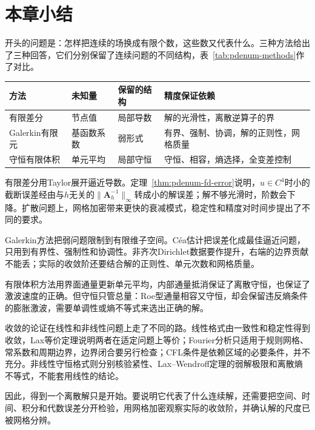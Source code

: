 \section{本章小结}
\label{sec:pdenum-summary}

开头的问题是：怎样把连续的场换成有限个数，这些数又代表什么。三种方法给出了三种回答，它们分别保留了连续问题的不同结构，表~\ref{tab:pdenum-methods}作了对比。

\begin{BookInlineTable}
 \centering
 \caption{三种离散方法的对比。}
 \label{tab:pdenum-methods}
 \begin{tabular}{p{16mm}p{20mm}p{20mm}p{38mm}}
  \toprule
  方法 & 未知量 & 保留的结构 & 精度保证依赖\\
  \midrule
  有限差分 & 节点值 & 局部导数 & 解的光滑性，离散逆算子的界\\
  Galerkin有限元 & 基函数系数 & 弱形式 & 有界、强制、协调，解的正则性，网格质量\\
  守恒有限体积 & 单元平均 & 局部守恒 & 守恒、相容，熵选择，全变差控制\\
  \bottomrule
 \end{tabular}
\end{BookInlineTable}

有限差分用Taylor展开逼近导数。定理~\ref{thm:pdenum-fd-error}说明，$u\in C^4$时小的截断误差经由与$h$无关的$\lVert\bm{A}_h^{-1}\rVert_\infty$转成小的解误差；解不够光滑时，阶数会下降。扩散问题上，网格加密带来更快的衰减模式，稳定性和精度对时间步提出了不同的要求。

Galerkin方法把弱问题限制到有限维子空间。Céa估计把误差化成最佳逼近问题，只用到有界性、强制性和协调性。非齐次Dirichlet数据要作提升，右端的边界贡献不能丢；实际的收敛阶还要结合解的正则性、单元次数和网格质量。

有限体积方法用界面通量更新单元平均，内部通量抵消保证了离散守恒，也保证了激波速度的正确。但守恒只管总量：Roe型通量相容又守恒，却会保留违反熵条件的膨胀激波，需要单调性或熵不等式来选出正确的解。

收敛的论证在线性和非线性问题上走了不同的路。线性格式由一致性和稳定性得到收敛，Lax等价定理说明两者在适定问题上等价；Fourier分析只适用于规则网格、常系数和周期边界，边界闭合要另行检查；CFL条件是依赖区域的必要条件，并不充分。非线性守恒格式则分别核验紧性、Lax--Wendroff定理的弱解极限和离散熵不等式，不能套用线性的结论。

因此，得到一个离散解只是开始。要说明它代表了什么连续解，还需要把空间、时间、积分和代数误差分开检验，用网格加密观察实际的收敛阶，并确认解的尺度已被网格分辨。
